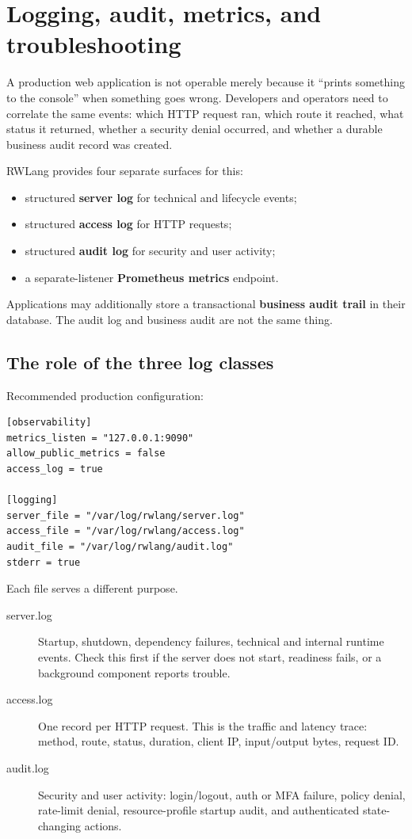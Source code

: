 \chapter{Logging, audit, metrics, and troubleshooting}

A production web application is not operable merely because it ``prints something to the console'' when something goes wrong. Developers and operators need to correlate the same events: which HTTP request ran, which route it reached, what status it returned, whether a security denial occurred, and whether a durable business audit record was created.

RWLang provides four separate surfaces for this:

\begin{itemize}
  \item structured \textbf{server log} for technical and lifecycle events;
  \item structured \textbf{access log} for HTTP requests;
  \item structured \textbf{audit log} for security and user activity;
  \item a separate-listener \textbf{Prometheus metrics} endpoint.
\end{itemize}

Applications may additionally store a transactional \textbf{business audit trail} in their database. The audit log and business audit are not the same thing.

\section{The role of the three log classes}

Recommended production configuration:

\begin{lstlisting}
[observability]
metrics_listen = "127.0.0.1:9090"
allow_public_metrics = false
access_log = true

[logging]
server_file = "/var/log/rwlang/server.log"
access_file = "/var/log/rwlang/access.log"
audit_file = "/var/log/rwlang/audit.log"
stderr = true
\end{lstlisting}

Each file serves a different purpose.

\begin{description}
  \item[server.log] Startup, shutdown, dependency failures, technical and internal runtime events. Check this first if the server does not start, readiness fails, or a background component reports trouble.
  \item[access.log] One record per HTTP request. This is the traffic and latency trace: method, route, status, duration, client IP, input/output bytes, request ID.
  \item[audit.log] Security and user activity: login/logout, auth or MFA failure, policy denial, rate-limit denial, resource-profile startup audit, and authenticated state-changing actions.
\end{description}

